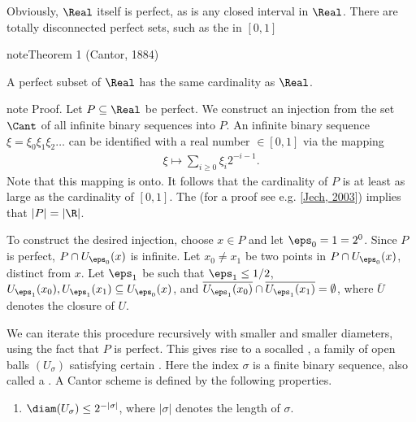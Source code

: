 \documentclass[letterpaper,10pt,english]{jupyterBook}
\begin{document}
\sphinxAtStartPar
Obviously, \(\Real\) itself is perfect, as is any closed interval in \(\Real\). There are totally disconnected perfect sets, such as the  in \([0,1]\)
\label{perfect_subsets_R:thm-card-perfect-sets}
\begin{sphinxadmonition}{note}{Theorem 1 (Cantor, 1884)}



\sphinxAtStartPar
A perfect subset of \(\Real\) has the same cardinality as \(\Real\).
\end{sphinxadmonition}

\begin{sphinxadmonition}{note}
\sphinxAtStartPar
Proof. Let \(P \subseteq \Real\) be perfect. We construct an injection from the set \(\Cant\) of all infinite binary sequences into \(P\). An infinite binary sequence \(\xi = \xi_0 \xi_1 \xi_2 \dots\) can be identified with a real number \(\in [0,1]\) via the mapping
\begin{equation*}
\begin{split}
\xi \mapsto \sum_{i \geq 0} \xi_i 2^{-i-1}.
\end{split}
\end{equation*}
\sphinxAtStartPar
Note that this mapping is onto. It follows that the cardinality of \(P\) is at least as large as the cardinality of \([0,1]\). The  (for a proof see e.g. {[}\hyperlink{cite.bibliography:id8}{Jech, 2003}{]})   implies that \(|P| = |\R|\).

\sphinxAtStartPar
To construct the desired injection, choose \(x \in P\) and let \(\eps_0 = 1 = 2^0\). Since \(P\) is perfect,  \(P \cap U_{\eps_0}(x)\) is infinite. Let \(x_0 \neq x_1\) be two points in \(P \cap U_{\eps_0}(x)\), distinct from \(x\). Let \(\eps_1\) be such that \(\eps_1 \leq 1/2\), \(U_{\eps_1}(x_0), U_{\eps_1}(x_1) \subseteq U_{\eps_0}(x)\), and \(\overline{U_{\eps_1}(x_0)} \cap \overline{U_{\eps_1}(x_1)} = \emptyset\), where \(\overline{U}\) denotes the closure of \(U\).

\sphinxAtStartPar
We can iterate this procedure recursively with smaller and smaller diameters, using the fact that \(P\) is perfect. This gives rise to a so\sphinxhyphen{}called , a family of open balls \((U_\sigma)\) satisfying certain . Here the index \(\sigma\) is a finite binary sequence, also called a . A Cantor scheme is defined by the following properties.
\begin{enumerate}
%
\item {} 
\sphinxAtStartPar
\(\diam(U_\sigma) \leq 2^{-|\sigma|}\), where \(|\sigma|\) denotes the length of \(\sigma\).


\end{enumerate}
\end{sphinxadmonition}
\end{document}
